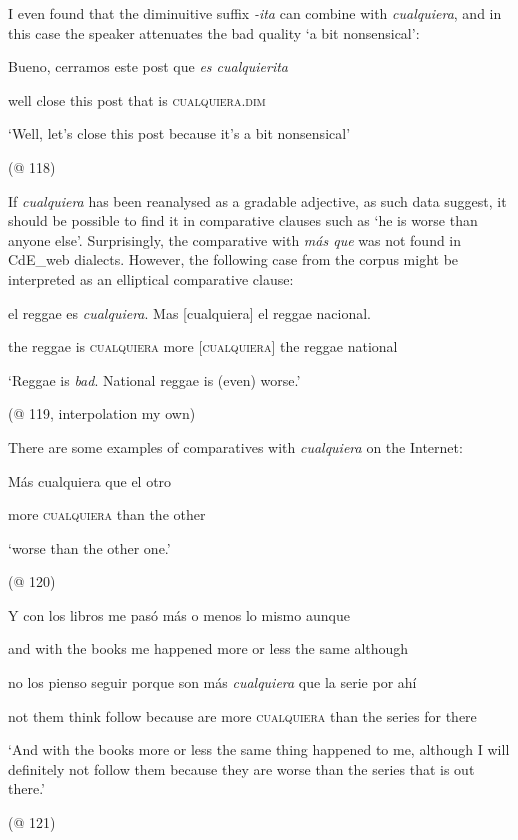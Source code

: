 \documentclass[output=paper]{langscibook}
\begin{document}
I even found that the diminuitive suffix \textit{-ita} can combine with \textit{cualquiera}, and in this case the speaker attenuates the bad quality ‘a bit nonsensical’:

    Bueno,  cerramos  este  post  que  \textit{es  cualquierita}

    well  close  this  post  that  is  \textsc{cualquiera}.\textsc{dim}

    ‘Well, let’s close this post because it’s a bit nonsensical’

    (@ 118) 

If \textit{cualquiera} has been reanalysed as a gradable adjective, as such data suggest, it should be possible to find it in comparative clauses such as ‘he is worse than anyone else’. Surprisingly, the comparative with \textit{más que} was not found in CdE\_web dialects. However, the following case from the corpus might be interpreted as an elliptical comparative clause:

    el  reggae  es  \textit{cualquiera}.  Mas  [cualquiera]   el  reggae  nacional.  

    the  reggae  is  \textsc{cualquiera}  more  \textsc{[cualquiera]}  the  reggae  national  

    ‘Reggae is \textit{bad}. National reggae is (even) worse.’

    (@ 119, interpolation my own)

There are some examples of comparatives with \textit{cualquiera} on the Internet:

    Más  cualquiera  que  el  otro          

    more  \textsc{cualquiera}  than  the  other          

    ‘worse than the other one.’

    (@ 120)

    Y  con  los  libros  me  pasó  más  o  menos  lo  mismo  aunque

    and  with  the  books  me  happened  more  or  less  the  same  although

    no  los  pienso  seguir  porque  son  más  \textit{cualquiera} que  la  serie  por  ahí

    not  them  think  follow  because  are  more  \textsc{cualquiera}  than  the  series  for  there

    ‘And with the books more or less the same thing happened to me, although I will definitely not follow them because they are worse than the series that is out there.’

    (@ 121)
\end{document}
